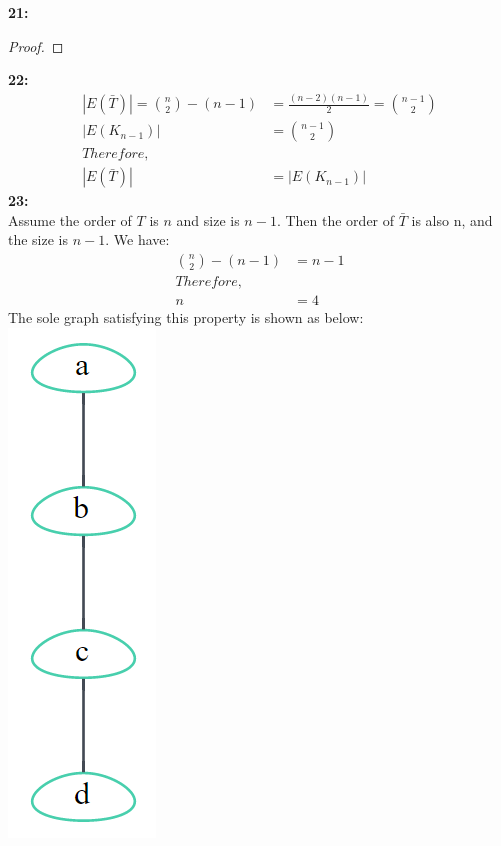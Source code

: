 \documentclass{article}
\begin{document}
\textbf{21:}
\begin{proof}

\end{proof}
\textbf{22:}\\
\[
\begin{aligned}
|E(\bar{T})|=\binom{n}{2}-(n-1)&=\frac{(n-2)(n-1)}{2}=\binom{n-1}{2}\\
|E(K_{n-1})|&=\binom{n-1}{2}\\
Therefore,\\
|E(\bar{T})|&=|E(K_{n-1})|
\end{aligned}
\]
\textbf{23:}\\
Assume the order of $T$ is $n$ and size is $n-1$. Then the order of $\bar{T}$ is also n, and the size is $n-1$. We have:
\[
\begin{aligned}
\binom{n}{2}-(n-1)&=n-1\\
Therefore,\\
n&=4
\end{aligned}
\] 
The sole graph satisfying this property is shown as below:\\
\includegraphics[scale=0.3]{17_5.png}
\end{document}
